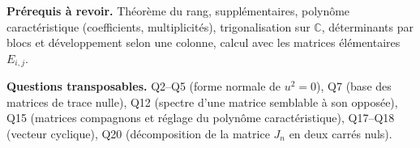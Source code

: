 \documentclass[11pt,a4paper]{article}
\begin{document}
\textbf{Prérequis à revoir.} Théorème du rang, supplémentaires, polynôme caractéristique (coefficients, multiplicités), trigonalisation sur \(\mathbb C\), déterminants par blocs et développement selon une colonne, calcul avec les matrices élémentaires \(E_{i,j}\).

\textbf{Questions transposables.} Q2--Q5 (forme normale de \(u^2=0\)), Q7 (base des matrices de trace nulle), Q12 (spectre d'une matrice semblable à son opposée), Q15 (matrices compagnons et réglage du polynôme caractéristique), Q17--Q18 (vecteur cyclique), Q20 (décomposition de la matrice \(J_n\) en deux carrés nuls).
\end{document}
